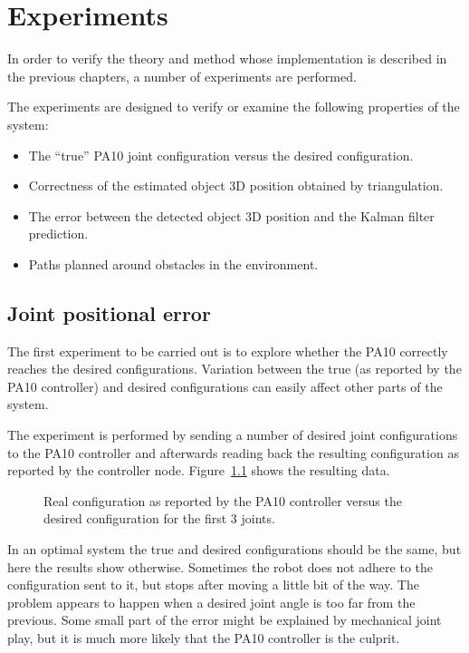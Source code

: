\chapter{Experiments}
\label{cha:experiments}
In order to verify the theory and method whose implementation is described in the previous chapters, a number of experiments are performed.

The experiments are designed to verify or examine the following properties of the system:
\begin{itemize}
    \item The ``true'' PA10 joint configuration versus the desired configuration.
    \item Correctness of the estimated object 3D position obtained by triangulation. %
    \item The error between the detected object 3D position and the Kalman filter prediction.
    \item Paths planned around obstacles in the environment.
\end{itemize}


\section{Joint positional error}
The first experiment to be carried out is to explore whether the PA10 correctly reaches the desired configurations.
Variation between the true (as reported by the PA10 controller) and desired configurations can easily affect other parts of the system.

The experiment is performed by sending a number of desired joint configurations to the PA10 controller and afterwards reading back the resulting configuration as reported by the controller node. Figure~\ref{fig:q_real_desired} shows the resulting data.

\begin{figure}[htb]
    \centering
    \resizebox{.8\columnwidth}{!}{%
        
    }
    \caption{Real configuration as reported by the PA10 controller versus the desired configuration for the first 3 joints.}
    \label{fig:q_real_desired}
\end{figure}

In an optimal system the true and desired configurations should be the same, but here the results show otherwise.
Sometimes the robot does not adhere to the configuration sent to it, but stops after moving a little bit of the way.
The problem appears to happen when a desired joint angle is too far from the previous.
Some small part of the error might be explained by mechanical joint play, but it is much more likely that the PA10 controller is the culprit.

